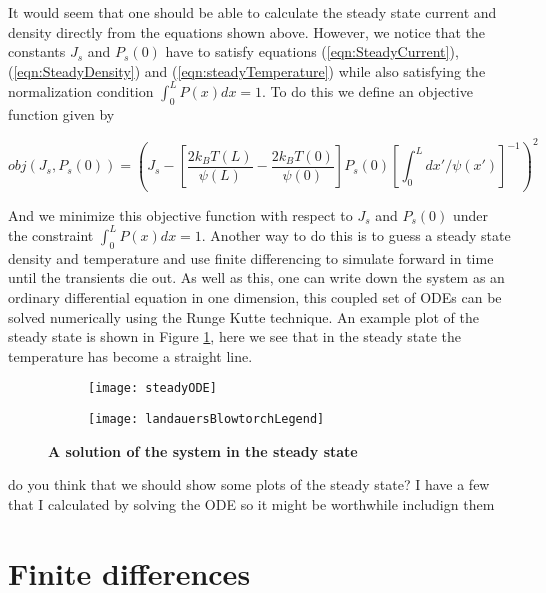 It would seem that one should be able to calculate the steady state current and density directly from the equations shown above. However, we notice that the constants $J_s$ and $P_s(0)$ have to satisfy equations (\ref{eqn:SteadyCurrent}), (\ref{eqn:SteadyDensity}) and (\ref{eqn:steadyTemperature}) while also satisfying the normalization condition $\int_0^L P(x) dx = 1$. To do this we define an objective function given by

\begin{equation}
obj(J_s, P_s(0)) = \left (J_s - \left [\frac{2 k_B T(L)}{\psi(L)} - \frac{2 k_B T(0)}{\psi(0)}  \right] P_s(0) \left [\int_0^L dx'/\psi(x') \right]^{-1} \right)^2  \label{eqn:Objective}
\end{equation}

And we minimize this objective function with respect to $J_s$ and $P_s(0)$ under the constraint $\int_0^L P(x) dx = 1$. Another way to do this is to guess a steady state density and temperature and use finite differencing to simulate forward in time until the transients die out. As well as this, one can write down the system as an ordinary differential equation in one dimension, this coupled set of ODEs can be solved numerically using the Runge Kutte technique. An example plot of the steady state is shown in Figure \ref{fig:steadyODE}, here we see that in the steady state the temperature has become a straight line.
\begin{figure}
	\begin{subfigure}{0.75\textwidth}
		\texttt{[image: steadyODE]}
	\end{subfigure}
	\begin{subfigure}{0.23\textwidth}
		\texttt{[image: landauersBlowtorchLegend]}
	\end{subfigure}
	\caption{\textbf{A solution of the system in the steady state} \label{fig:steadyODE}}
\end{figure}
{\color{red} do you think that we should show some plots of the steady state? I have a few that I calculated by solving the ODE so it might be worthwhile includign them} 

\section{Finite differences}  \label{numerics}

